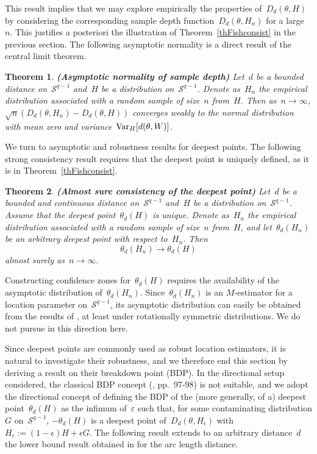 \documentclass[usenames,dvipsnames]{article}
\newtheorem{thm}{Theorem}
\begin{document}
This result implies that we may explore empirically the properties of~$D_d(\theta,H)$ by considering the corresponding sample depth function~$D_d(\theta,H_n)$ for a large~$n$. This justifies a posteriori the illustration of Theorem~\ref{thFishconsist} in the previous section.
The following asymptotic normality is a direct result of the central limit theorem.

\begin{thm}{\textbf{(Asymptotic normality of sample depth)}} 
\label{thasnormD}
Let~$d$ be a bounded distance on~$\mathcal{S}^{q-1}$ and~$H$ be a distribution on~$\mathcal{S}^{q-1}$. Denote as~$H_n$ the empirical distribution associated with a random sample of size~$n$ from~$H$. Then as~$n\to\infty$,
$
\sqrt{n}(D_{d}(\theta, H_n)-D_{d}(\theta, H))
$
converges weakly to the normal distribution with mean zero and variance~${\rm Var}_H[d(\theta,W)]$. 
\end{thm}

We turn to asymptotic and robustness results for deepest points. The following strong consistency result requires that the deepest point is uniquely defined, as it is in Theorem~\ref{thFishconsist}. 

\begin{thm}{\textbf{(Almost sure consistency of the deepest point)}} 
\label{thdeepestconsistency}
Let~$d$ be a bounded and continuous distance on~$\mathcal{S}^{q-1}$ and~$H$ be a distribution on~$\mathcal{S}^{q-1}$. Assume that the deepest point~$\theta_d(H)$ is unique. Denote as~$H_n$ the empirical distribution associated with a random sample of size~$n$ from~$H$, and let~$\theta_d(H_n)$ be an arbitrary deepest point with respect to~$H_n$. Then
$$
\theta_d(H_n)
\to
\theta_d(H)
$$
almost surely as~$n\to\infty$.  
\end{thm}

Constructing confidence zones for~$\theta_d(H)$ requires the availability of the asymptotic distribution of~$\theta_d(H_n)$. Since~$\theta_d(H_n)$ is an $M$-estimator for a location parameter on~$\mathcal{S}^{q-1}$, its asymptotic distribution can easily be obtained from the results of \cite{KoCha1993}, at least under rotationally symmetric distributions. %
We do not pursue in this direction here.

Since deepest points are commonly used as robust location estimators, it is natural to investigate their robustness, and we therefore end this section by deriving a result on their breakdown point (BDP). In the directional setup considered, the classical BDP concept (\cite{Hametal1986}, pp.~97-98) is not suitable, and we adopt the directional concept of \cite{LiuSin1992} defining the BDP of the (more generally, of a) deepest point~$\theta_d(H)$ as the infimum 
of~$\varepsilon$ such that, for some contaminating distribution $G$ on~$\mathcal{S}^{q-1}$, $-\theta_d(H)$ is a deepest point of~$D_d(\theta, H_{\epsilon})$ with~$H_{\epsilon}:= \left(1 - \epsilon \right) H + \epsilon G$. The following result extends to an arbitrary distance~$d$ the lower bound result obtained in \cite{LiuSin1992} for the arc length distance.
\end{document}
